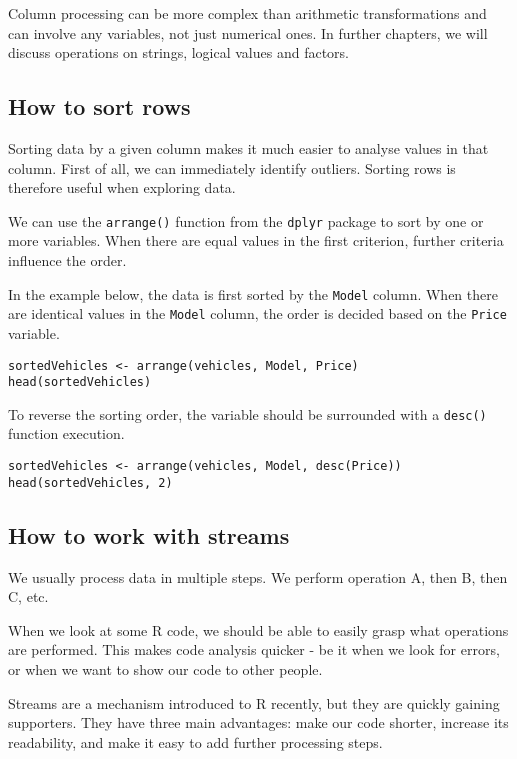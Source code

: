 \documentclass[]{book}
\theoremstyle{definition}
\theoremstyle{definition}
\theoremstyle{definition}
\theoremstyle{remark}
\begin{document}
Column processing can be more complex than arithmetic transformations
and can involve any variables, not just numerical ones. In further
chapters, we will discuss operations on strings, logical values and
factors.

\subsection{How to sort rows}\label{part_254}

Sorting data by a given column makes it much easier to analyse values in
that column. First of all, we can immediately identify outliers. Sorting
rows is therefore useful when exploring data.

We can use the \texttt{arrange()} function from the \texttt{dplyr}
package to sort by one or more variables. When there are equal values in
the first criterion, further criteria influence the order.

In the example below, the data is first sorted by the \texttt{Model}
column. When there are identical values in the \texttt{Model} column,
the order is decided based on the \texttt{Price} variable.

\begin{verbatim}
sortedVehicles <- arrange(vehicles, Model, Price)
head(sortedVehicles)
\end{verbatim}

To reverse the sorting order, the variable should be surrounded with a
\texttt{desc()} function execution.

\begin{verbatim}
sortedVehicles <- arrange(vehicles, Model, desc(Price))
head(sortedVehicles, 2)
\end{verbatim}

\subsection{How to work with streams}\label{part_255}

We usually process data in multiple steps. We perform operation A, then
B, then C, etc.

When we look at some R code, we should be able to easily grasp what
operations are performed. This makes code analysis quicker - be it when
we look for errors, or when we want to show our code to other people.

Streams are a mechanism introduced to R recently, but they are quickly
gaining supporters. They have three main advantages: make our code
shorter, increase its readability, and make it easy to add further
processing steps.
\end{document}
